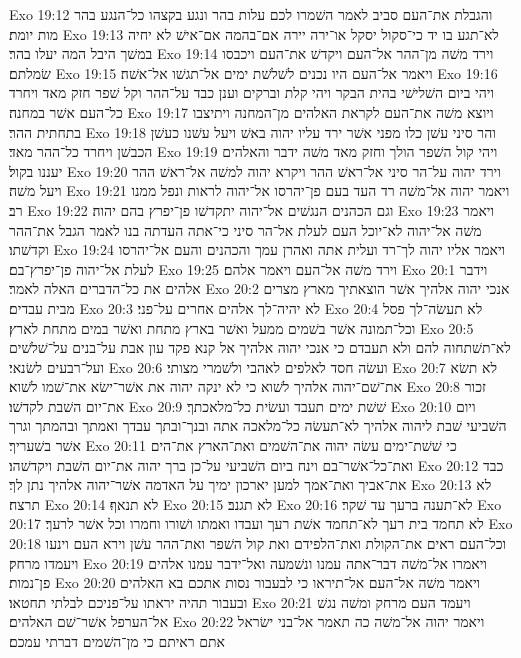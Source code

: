 Exo 19:12  והגבלת את־העם סביב לאמר השׁמרו לכם עלות בהר ונגע בקצהו כל־הנגע בהר מות יומת׃
Exo 19:13  לא־תגע בו יד כי־סקול יסקל או־ירה יירה אם־בהמה אם־אישׁ לא יחיה במשׁך היבל המה יעלו בהר׃
Exo 19:14  וירד משׁה מן־ההר אל־העם ויקדשׁ את־העם ויכבסו שׂמלתם׃
Exo 19:15  ויאמר אל־העם היו נכנים לשׁלשׁת ימים אל־תגשׁו אל־אשׁה׃
Exo 19:16  ויהי ביום השׁלישׁי בהית הבקר ויהי קלת וברקים וענן כבד על־ההר וקל שׁפר חזק מאד ויחרד כל־העם אשׁר במחנה׃
Exo 19:17  ויוצא משׁה את־העם לקראת האלהים מן־המחנה ויתיצבו בתחתית ההר׃
Exo 19:18  והר סיני עשׁן כלו מפני אשׁר ירד עליו יהוה באשׁ ויעל עשׁנו כעשׁן הכבשׁן ויחרד כל־ההר מאד׃
Exo 19:19  ויהי קול השׁפר הולך וחזק מאד משׁה ידבר והאלהים יעננו בקול׃
Exo 19:20  וירד יהוה על־הר סיני אל־ראשׁ ההר ויקרא יהוה למשׁה אל־ראשׁ ההר ויעל משׁה׃
Exo 19:21  ויאמר יהוה אל־משׁה רד העד בעם פן־יהרסו אל־יהוה לראות ונפל ממנו רב׃
Exo 19:22  וגם הכהנים הנגשׁים אל־יהוה יתקדשׁו פן־יפרץ בהם יהוה׃
Exo 19:23  ויאמר משׁה אל־יהוה לא־יוכל העם לעלת אל־הר סיני כי־אתה העדתה בנו לאמר הגבל את־ההר וקדשׁתו׃
Exo 19:24  ויאמר אליו יהוה לך־רד ועלית אתה ואהרן עמך והכהנים והעם אל־יהרסו לעלת אל־יהוה פן־יפרץ־בם׃
Exo 19:25  וירד משׁה אל־העם ויאמר אלהם׃
Exo 20:1  וידבר אלהים את כל־הדברים האלה לאמר׃
Exo 20:2  אנכי יהוה אלהיך אשׁר הוצאתיך מארץ מצרים מבית עבדים׃
Exo 20:3  לא יהיה־לך אלהים אחרים על־פני׃
Exo 20:4  לא תעשׂה־לך פסל וכל־תמונה אשׁר בשׁמים ממעל ואשׁר בארץ מתחת ואשׁר במים מתחת לארץ׃
Exo 20:5  לא־תשׁתחוה להם ולא תעבדם כי אנכי יהוה אלהיך אל קנא פקד עון אבת על־בנים על־שׁלשׁים ועל־רבעים לשׂנאי׃
Exo 20:6  ועשׂה חסד לאלפים לאהבי ולשׁמרי מצותי׃
Exo 20:7  לא תשׂא את־שׁם־יהוה אלהיך לשׁוא כי לא ינקה יהוה את אשׁר־ישׂא את־שׁמו לשׁוא׃
Exo 20:8  זכור את־יום השׁבת לקדשׁו׃
Exo 20:9  שׁשׁת ימים תעבד ועשׂית כל־מלאכתך׃
Exo 20:10  ויום השׁביעי שׁבת ליהוה אלהיך לא־תעשׂה כל־מלאכה אתה ובנך־ובתך עבדך ואמתך ובהמתך וגרך אשׁר בשׁעריך׃
Exo 20:11  כי שׁשׁת־ימים עשׂה יהוה את־השׁמים ואת־הארץ את־הים ואת־כל־אשׁר־בם וינח ביום השׁביעי על־כן ברך יהוה את־יום השׁבת ויקדשׁהו׃
Exo 20:12  כבד את־אביך ואת־אמך למען יארכון ימיך על האדמה אשׁר־יהוה אלהיך נתן לך׃
Exo 20:13  לא תרצח׃
Exo 20:14  לא תנאף׃
Exo 20:15  לא תגנב׃
Exo 20:16  לא־תענה ברעך עד שׁקר׃
Exo 20:17  לא תחמד בית רעך לא־תחמד אשׁת רעך ועבדו ואמתו ושׁורו וחמרו וכל אשׁר לרעך׃
Exo 20:18  וכל־העם ראים את־הקולת ואת־הלפידם ואת קול השׁפר ואת־ההר עשׁן וירא העם וינעו ויעמדו מרחק׃
Exo 20:19  ויאמרו אל־משׁה דבר־אתה עמנו ונשׁמעה ואל־ידבר עמנו אלהים פן־נמות׃
Exo 20:20  ויאמר משׁה אל־העם אל־תיראו כי לבעבור נסות אתכם בא האלהים ובעבור תהיה יראתו על־פניכם לבלתי תחטאו׃
Exo 20:21  ויעמד העם מרחק ומשׁה נגשׁ אל־הערפל אשׁר־שׁם האלהים׃
Exo 20:22  ויאמר יהוה אל־משׁה כה תאמר אל־בני ישׂראל אתם ראיתם כי מן־השׁמים דברתי עמכם׃
